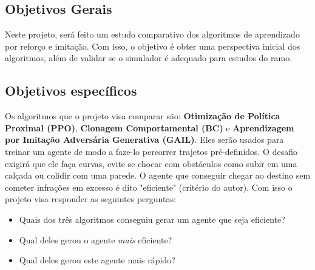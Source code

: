 \subsection*{Objetivos Gerais}
Neste projeto, será feito um estudo comparativo dos algoritmos de aprendizado por reforço e imitação. Com isso, o objetivo é obter uma perspectiva inicial dos algoritmos, além de validar se o simulador é adequado para estudos do ramo.

\subsection*{Objetivos específicos}
Os algoritmos que o projeto visa comparar são: \textbf{Otimização de Política Proximal (PPO)}, \textbf{Clonagem Comportamental (BC)} e \textbf{Aprendizagem por Imitação Adversária Generativa (GAIL)}. Eles serão usados para treinar um agente de modo a faze-lo percorrer trajetos pré-definidos. O desafio exigirá que ele faça curvas, evite se chocar com obstáculos como subir em uma calçada ou colidir com uma parede. O agente que conseguir chegar ao destino sem cometer infrações em excesso é dito "eficiente" (critério do autor). Com isso o projeto visa responder as seguintes perguntas:

\begin{itemize}
    \item Quais dos três algoritmos conseguiu gerar um agente que seja eficiente?
    \item Qual deles gerou o agente \textit{mais} eficiente?
    \item Qual deles gerou este agente mais rápido?
\end{itemize}
